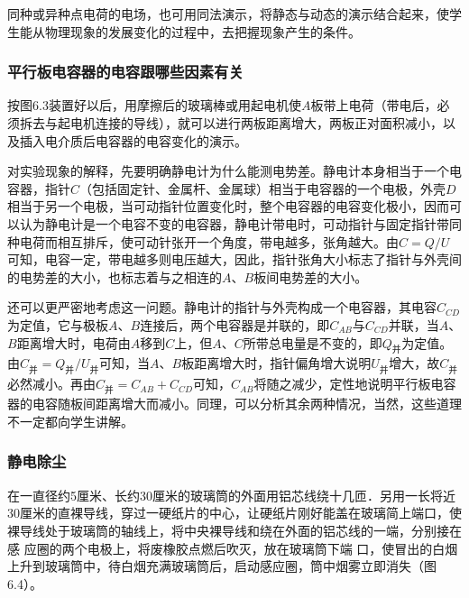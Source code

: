 同种或异种点电荷的电场，也可用同法演示，将静态与动态的演示结合起来，使学生能从物理现象的发展变化的过程中，去把握现象产生的条件。

\subsubsection{平行板电容器的电容跟哪些因素有关}
按图6.3装置好以后，用摩擦后的玻璃棒或用起电机使$A$板带上电荷（带电后，必须拆去与起电机连接的导线），就可以进行两板距离增大，两板正对面积减小，以及插入电介质后电容器的电容变化的演示。
\begin{figure}[htp]
    \centering
    \caption{}
\end{figure}

对实验现象的解释，先要明确静电计为什么能测电势差。静电计本身相当于一个电容器，指针$C$（包括固定针、金属杆、金属球）相当于电容器的一个电极，外壳$D$相当于另一个电极，当可动指针位置变化时，整个电容器的电容变化极小，因而可
以认为静电计是一个电容不变的电容器，静电计带电时，可动指针与固定指针带同种电荷而相互排斥，使可动针张开一个角度，带电越多，张角越大。由$C=Q/U$可知，电容一定，带电越多则电压越大，因此，指针张角大小标志了指针与外壳间的电势差的大小，也标志着与之相连的$A$、$B$板间电势差的大小。

还可以更严密地考虑这一问题。静电计的指针与外壳构成一个电容器，其电容$C_{CD}$为定值，它与极板$A$、$B$连接后，两个电容器是并联的，即$C_{AB}$与$C_{CD}$并联，当$A$、$B$距离增大时，电荷由$A$移到$C$上，但$A$、$C$所带总电量是不变的，即$Q_{\text{并}}$为定值。由$C_{\text{并}}=Q_{\text{并}}/U_{\text{并}}$可知，当$A$、$B$板距离增大时，指针偏角增大说明$U_{\text{并}}$增大，故$C_{\text{并}}$必然减小。再由$C_{\text{并}}=C_{AB}+C_{CD}$可知，$C_{AB}$将随之减少，定性地说明平行板电容器的电容随板间距离增大而减小。同理，可以分析其余两种情况，当然，这些道理不一定都向学生讲解。

\subsubsection{静电除尘}

在一直径约5厘米、长约30厘米的玻璃筒的外面用铝芯线绕十几匝．另用一长将近30厘米的直裸导线，穿过一硬纸片的中心，让硬纸片刚好能盖在玻璃简上端口，使裸导线处于玻璃筒的轴线上，将中央裸导线和绕在外面的铝芯线的一端，分别接在感
应圈的两个电极上，将废橡胶点燃后吹灭，放在玻璃筒下端
口，使冒出的白烟上升到玻璃筒中，待白烟充满玻璃筒后，启动感应圈，筒中烟雾立即消失（图6.4）。

\begin{figure}[htp]
    \centering
    \caption{}
\end{figure}

